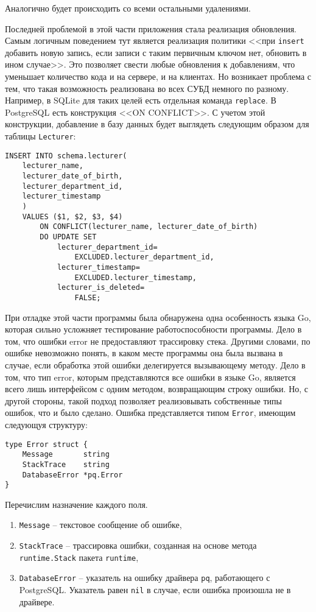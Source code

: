 Аналогично будет происходить со всеми остальными удалениями.

Последней проблемой в этой части приложения стала реализация обновления. Самым логичным поведением тут
является реализация политики <<при \texttt{insert} добавить новую запись, если записи с таким первичным ключом нет, 
обновить в ином случае>>. Это позволяет свести любые обновления к добавлениям, что уменьшает количество
кода и на сервере, и на клиентах. Но возникает проблема с тем, что такая возможность реализована во всех
СУБД немного по разному. Например, в SQLite для таких целей есть отдельная команда \texttt{replace}.
В PostgreSQL есть конструкция <<ON CONFLICT>>. С учетом этой конструкции, добавление
в базу данных будет выглядеть следующим образом для таблицы \texttt{Lecturer}:

\begin{lstlisting}
INSERT INTO schema.lecturer(
    lecturer_name, 
    lecturer_date_of_birth,
    lecturer_department_id, 
    lecturer_timestamp
    ) 
    VALUES ($1, $2, $3, $4)
        ON CONFLICT(lecturer_name, lecturer_date_of_birth) 
        DO UPDATE SET
            lecturer_department_id=
                EXCLUDED.lecturer_department_id,
            lecturer_timestamp=
                EXCLUDED.lecturer_timestamp,
            lecturer_is_deleted=
                FALSE;
\end{lstlisting}

При отладке этой части программы была обнаружена одна особенность языка Go, которая
сильно усложняет тестирование работоспособности программы. Дело в том, что ошибки 
error не предоставляют трассировку стека. Другими словами, по ошибке невозможно понять,
в каком месте программы она была вызвана в случае, если обработка этой ошибки делегируется
вызывающему методу. Дело в том, что тип error, которым представляются все ошибки в языке
Go, является всего лишь интерфейсом с одним методом, возвращающим строку ошибки.
Но, с другой стороны, такой подход позволяет реализовывать собственные типы ошибок,
что и было сделано. Ошибка представляется типом \texttt{Error}, имеющим следующуя структуру:

\begin{lstlisting}
type Error struct {
	Message       string
	StackTrace    string
	DatabaseError *pq.Error
}
\end{lstlisting}

Перечислим назначение каждого поля.

\begin{enumerate}
    \item \texttt{Message} -- текстовое сообщение об ошибке,
    \item \texttt{StackTrace} -- трассировка ошибки, созданная на основе метода \texttt{runtime.Stack} пакета \texttt{runtime},
    \item \texttt{DatabaseError} -- указатель на ошибку драйвера \texttt{pq}, работающего с PostgreSQL. Указатель равен \texttt{nil}
        в случае, если ошибка произошла не в драйвере.
\end{enumerate}

